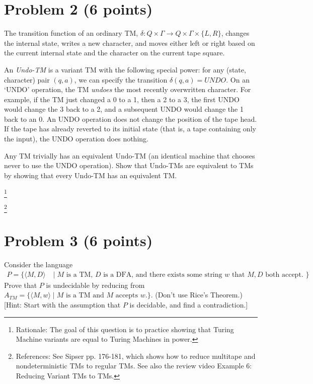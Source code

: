 \documentclass[letterpaper,11pt,twoside]{article}
\theoremstyle{plain}
\theoremstyle{definition}
\theoremstyle{remark}
\theoremstyle{restate}
\newcommand\blfootnote[1]{%
  \begingroup
  \renewcommand\thefootnote{}\footnote{#1}%
  \addtocounter{footnote}{-1}%
  \endgroup
}
\begin{document}
\clearpage
\section*{Problem 2 (6 points)}
    The transition function of an ordinary TM, $\delta: Q \times \Gamma \rightarrow Q \times \Gamma \times \{L, R\}$, changes the internal state, writes a new character, and moves either left or right based on the current internal state and the character on the current tape square. 

    An \emph{Undo-TM} is a variant TM with the following special power: for any (state, character) pair $(q, a)$, we can specify the transition $\delta(q, a) = UNDO$. On an `UNDO' operation, the TM \emph{undoes} the most recently overwritten character. For example, if the TM just changed a 0 to a 1, then a 2 to a 3, the first UNDO would change the 3 back to a 2, and a subsequent UNDO would change the 1 back to an 0. An UNDO operation does not change the position of the tape head. If the tape has already reverted to its initial state (that is, a tape containing only the input), the UNDO operation does nothing.

    Any TM trivially has an equivalent Undo-TM (an identical machine that chooses never to use the UNDO operation). Show that Undo-TMs are equivalent to TMs by showing that every Undo-TM has an equivalent TM.

    
    \blfootnote{ Rationale: The goal of this question is to practice showing that Turing Machine variants are equal to Turing Machines in power. }
    \blfootnote{ References: See Sipser pp. 176-181, which shows how to reduce multitape and nondeterministic TMs to regular TMs. See also the review video Example 6: Reducing Variant TMs to TMs. }

\clearpage
\section*{Problem 3 (6 points)}
    Consider the language
    \begin{align*}
    P = \{\langle M, D \rangle \; &| \; M \text{ is a TM, } D \text{ is a DFA, and there exists some string } w \text{ that } M, D \text{ both accept. } \}
    \end{align*}
    Prove that $P$ is undecidable by reducing from $A_{TM} = \{\langle M, w \rangle \; | \; M \text{ is a TM and $M$ accepts $w$.} \}$. (Don't use Rice's Theorem.) [Hint: Start with the assumption that $P$ is decidable, and find a contradiction.]
    
\end{document}
